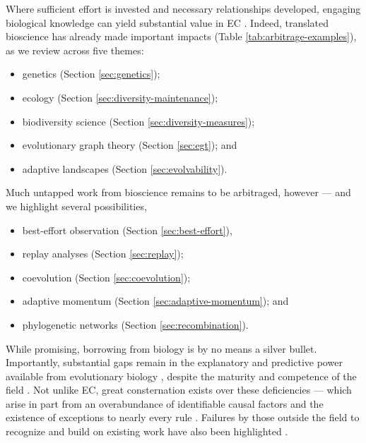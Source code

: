Where sufficient effort is invested and necessary relationships developed, engaging biological knowledge can yield substantial value in EC \citep{hu2010evolvability,dolson2018ecological,paixao2015toward,wagner1996perspective}.
Indeed, translated bioscience has already made important impacts (Table \ref{tab:arbitrage-examples}), as we review across five themes:
\begin{itemize}
  \item genetics (Section \ref{sec:genetics});
  \item ecology (Section \ref{sec:diversity-maintenance});
  \item biodiversity science (Section \ref{sec:diversity-measures});
  \item evolutionary graph theory (Section \ref{sec:egt}); and
  \item adaptive landscapes (Section \ref{sec:evolvability}).
\end{itemize}

Much untapped work from bioscience remains to be arbitraged, however --- and we highlight several possibilities,
\begin{itemize}
  \item best-effort observation (Section \ref{sec:best-effort}),
  \item replay analyses (Section \ref{sec:replay});
  \item coevolution (Section \ref{sec:coevolution});
  \item adaptive momentum (Section \ref{sec:adaptive-momentum}); and
  \item phylogenetic networks (Section \ref{sec:recombination}).
\end{itemize}





While promising, borrowing from biology is by no means a silver bullet.
Importantly, substantial gaps remain in the explanatory and predictive power available from evolutionary biology \citep{houlahan2016priority,catford2022addressing,yates2018outstanding}, despite the maturity and competence of the field \citep{lynch2025complexity}.
Not unlike EC, great consternation exists over these deficiencies --- which arise in part from an overabundance of identifiable causal factors and the existence of exceptions to nearly every rule \citep{welch2016whats}.
Failures by those outside the field to recognize and build on existing work have also been highlighted \citep{lynch2025complexity,beer2024alife}.

